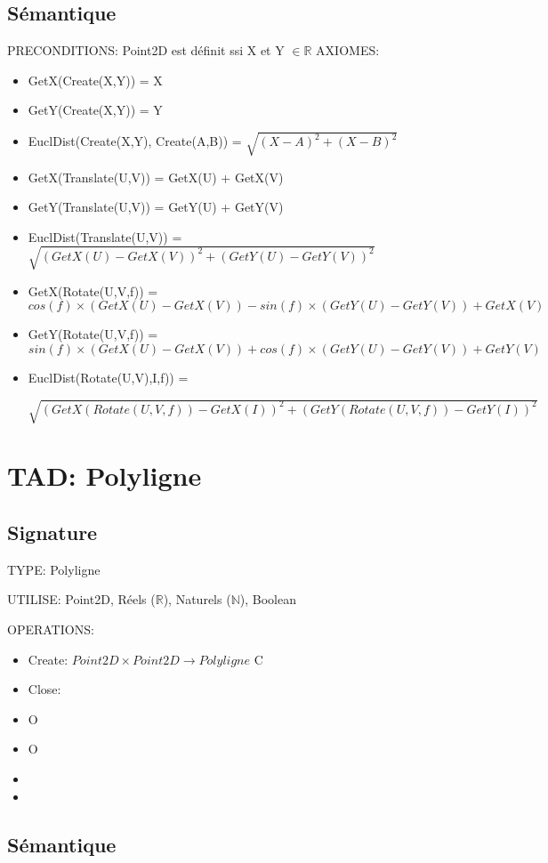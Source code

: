 \documentclass[a4paper, 11pt, oneside]{article}
\begin{document}
\subsection{Sémantique}
\noindent PRECONDITIONS: Point2D est définit ssi X et Y $\in \mathbb{R}$ 
\noindent AXIOMES: 
\begin{itemize}
    \item GetX(Create(X,Y)) = X
    \item GetY(Create(X,Y)) = Y
    \item EuclDist(Create(X,Y), Create(A,B)) = $\sqrt{{(X-A)}^{2}+{(X-B)}^{2}}$
    \item GetX(Translate(U,V)) = GetX(U) + GetX(V)
    \item GetY(Translate(U,V)) = GetY(U) + GetY(V)
    \item EuclDist(Translate(U,V)) = $\sqrt{{(GetX(U)-GetX(V))}^{2}+{(GetY(U)-GetY(V))}^{2}}$
    \item GetX(Rotate(U,V,f)) = $cos(f) \times (GetX(U)-GetX(V)) - sin(f) \times (GetY(U)-GetY(V)) + GetX(V) $ 
    \item GetY(Rotate(U,V,f)) = $sin(f) \times (GetX(U)-GetX(V)) + cos(f) \times (GetY(U)-GetY(V)) + GetY(V) $ 
    \item EuclDist(Rotate(U,V),I,f)) =
    
    $\sqrt{{(GetX(Rotate(U,V,f))-GetX(I))}^{2}+{(GetY(Rotate(U,V,f))-GetY(I))}^{2}}$
\end{itemize}


\section{TAD: Polyligne}

\subsection{Signature}

\noindent TYPE: Polyligne

\noindent UTILISE: Point2D, Réels ($\mathbb{R}$), Naturels ($\mathbb{N}$), Boolean

\noindent OPERATIONS: 
\begin{itemize}
    \item Create: $Point2D \times Point2D \xrightarrow{} Polyligne$ {\color{green} C}
    \item Close: $ $
    \item  {\color{green} O}
    \item  {\color{green} O}
    \item
    \item 
\end{itemize}

\subsection{Sémantique}
\end{document}
